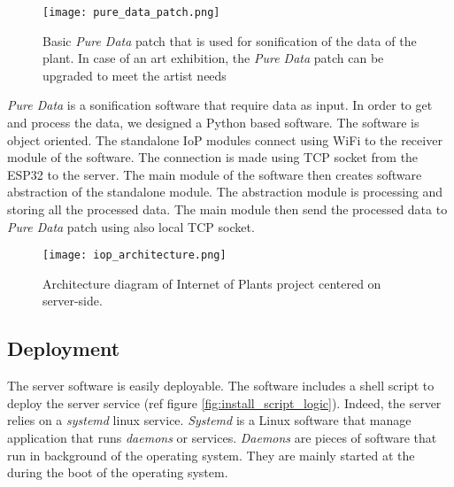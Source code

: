 \begin{figure}[h]
    \centering
    \texttt{[image: pure\_data\_patch.png]}
    \caption{Basic \textit{Pure Data} patch that is used for sonification of the data
        of the plant. In case of an art exhibition, the \textit{Pure Data} patch can be upgraded to meet the
        artist needs}
    \vspace{0.1cm}
    \label{fig:pure_data_patch}
\end{figure}


\textit{Pure Data} is a sonification software that require data as input. In order to get and process the data, we designed a Python based software. %
The software is object oriented. The standalone IoP modules connect using WiFi to the receiver module
of the software. The connection is made using TCP socket from the ESP32 to the server.
The main module of the software then creates software abstraction of the standalone module.
The abstraction module is processing and storing all the processed data.
The main module then send the processed data to \textit{Pure Data} patch using also local TCP socket.

\begin{figure}[h]
    \centering
    \texttt{[image: iop\_architecture.png]}
    \caption{Architecture diagram of Internet of Plants project centered on server-side.}
    \vspace{0.1cm}
    \label{fig:server_architecture}
\end{figure}


\subsection{Deployment} %

The server software is easily deployable. The software includes a shell script to deploy the server service (ref figure \ref{fig:install_script_logic}).
Indeed, the server relies on a \textit{systemd} linux service. \textit{Systemd} \cite{Both2020} is a Linux software that manage application that runs \textit{daemons} or services.
\textit{Daemons} are pieces of software that run in background of the operating
system. They are mainly started at the during the boot of the operating system.


